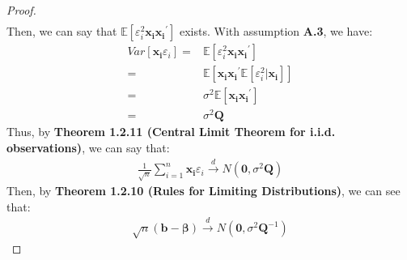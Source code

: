 \documentclass{article}
\begin{document}
\begin{proof}
\begin{align*}
			\end{align*}
		Then, we can say that $\mathbb{E}[\varepsilon^2_i \boldsymbol{x_i} \boldsymbol{x_i}^\prime]$ exists. With assumption \textbf{A.3}, we have:
			\begin{align*}
				Var[\boldsymbol{x_i} \varepsilon_i] = &\mathbb{E}[\varepsilon^2_i \boldsymbol{x_i} \boldsymbol{x_i}^\prime]\\
				= &\mathbb{E}[\boldsymbol{x_i} \boldsymbol{x_i}^\prime \mathbb{E}[\varepsilon^2_i | \boldsymbol{x_i}]]\\
				= &\sigma^2 \mathbb{E}[\boldsymbol{x_i} \boldsymbol{x_i}^\prime]\\
				= & \sigma^2 \boldsymbol{Q}
			\end{align*}
		Thus, by \textbf{Theorem 1.2.11 (Central Limit Theorem for i.i.d. observations)}, we can say that:
			\begin{align*}
				\frac{1}{\sqrt{n}} \sum\limits^n_{i=1} \boldsymbol{x_i} \varepsilon_i \xrightarrow{d} N(\boldsymbol{0}, \sigma^2 \boldsymbol{Q})
			\end{align*}
		Then, by \textbf{Theorem 1.2.10 (Rules for Limiting Distributions)}, we can see that:
			\begin{align*}
				\sqrt{n}(\boldsymbol{b} - \boldsymbol{\beta}) \xrightarrow{d} N(\boldsymbol{0}, \sigma^2 \boldsymbol{Q}^{-1})
			\end{align*}
	\end{proof}
\end{document}
